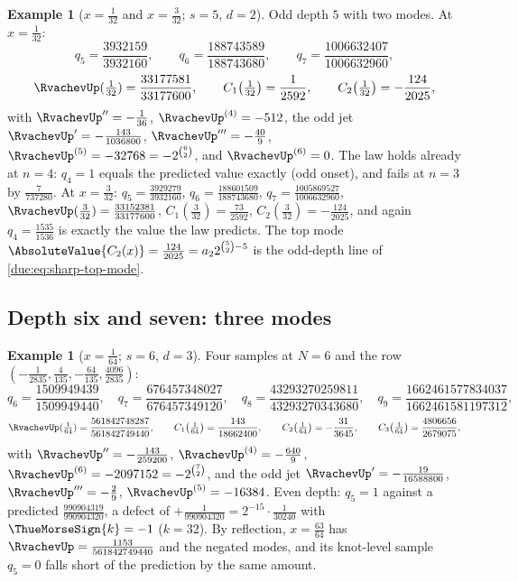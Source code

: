 \documentclass[11pt,oneside]{article}
\theoremstyle{plain}
\theoremstyle{definition}
\newtheorem{example}[theorem]{Example}
\theoremstyle{remark}
\newcommand{\upn}[1]{\RvachevUp_{#1}}
\newcommand{\am}[1]{a_{#1}}                                 %
\newcommand{\Cr}[2]{C_{#1}\!\left(#2\right)}                %
\newcommand{\qn}[1]{q_{#1}}                                 %
\begin{document}
\begin{example}[$x=\tfrac1{32}$ and $x=\tfrac3{32}$; $s=5$, $d=2$]
\label{due:ex:exr-thirty-second}
Odd depth $5$ with two modes.  At $x=\tfrac1{32}$:
\[
 \qn{5}=\frac{3932159}{3932160},\qquad
 \qn{6}=\frac{188743589}{188743680},\qquad
 \qn{7}=\frac{1006632407}{1006632960},
\]
\[
 \RvachevUp(\tfrac1{32})=\frac{33177581}{33177600},\qquad
 \Cr{1}{\tfrac1{32}}=\frac{1}{2592},\qquad
 \Cr{2}{\tfrac1{32}}=-\frac{124}{2025},
\]
with $\RvachevUp''=-\tfrac1{36}$, $\RvachevUp^{(4)}=-512$, the odd jet
$\RvachevUp'=-\tfrac{143}{1036800}$, $\RvachevUp'''=-\tfrac{40}9$,
$\RvachevUp^{(5)}=-32768=-2^{\binom62}$, and $\RvachevUp^{(6)}=0$.  The law
holds already at $n=4$: $\qn{4}=1$ equals the predicted value exactly
(odd onset), and fails at $n=3$ by $\tfrac7{737280}$.  At $x=\tfrac3{32}$:
$\qn{5}=\tfrac{3929279}{3932160}$, $\qn{6}=\tfrac{188601509}{188743680}$,
$\qn{7}=\tfrac{1005869527}{1006632960}$,
$\RvachevUp(\tfrac3{32})=\tfrac{33152381}{33177600}$,
$\Cr{1}{\tfrac3{32}}=\tfrac{73}{2592}$, $\Cr{2}{\tfrac3{32}}=-\tfrac{124}{2025}$,
and again $\qn{4}=\tfrac{1535}{1536}$ is exactly the value the law predicts.
The top mode $\AbsoluteValue{\Cr{2}{x}}=\tfrac{124}{2025}=\am{2}2^{\binom52-5}$
is the odd-depth line of \cref{due:eq:sharp-top-mode}.
\end{example}

\subsection{Depth six and seven: three modes}
\label{due:sec:exr-three-modes}

\begin{example}[$x=\tfrac1{64}$; $s=6$, $d=3$]
\label{due:ex:exr-sixty-fourth}
Four samples at $N=6$ and the row
$(-\tfrac1{2835},\tfrac4{135},-\tfrac{64}{135},\tfrac{4096}{2835})$:
\[
 \qn{6}=\frac{1509949439}{1509949440},\quad
 \qn{7}=\frac{676457348027}{676457349120},\quad
 \qn{8}=\frac{43293270259811}{43293270343680},\quad
 \qn{9}=\frac{1662461577834037}{1662461581197312},
\]
\[
 \RvachevUp(\tfrac1{64})=\frac{561842748287}{561842749440},\qquad
 \Cr{1}{\tfrac1{64}}=\frac{143}{18662400},\qquad
 \Cr{2}{\tfrac1{64}}=-\frac{31}{3645},\qquad
 \Cr{3}{\tfrac1{64}}=\frac{4806656}{2679075},
\]
with $\RvachevUp''=-\tfrac{143}{259200}$, $\RvachevUp^{(4)}=-\tfrac{640}9$,
$\RvachevUp^{(6)}=-2097152=-2^{\binom72}$, and the odd jet
$\RvachevUp'=-\tfrac{19}{16588800}$, $\RvachevUp'''=-\tfrac29$,
$\RvachevUp^{(5)}=-16384$.  Even depth: $\qn{5}=1$ against a predicted
$\tfrac{990904319}{990904320}$, a defect of $+\tfrac1{990904320}
=2^{-15}\cdot\tfrac1{30240}$ with $\ThueMorseSign{k}=-1$ ($k=32$).  By
reflection, $x=\tfrac{63}{64}$ has $\RvachevUp=\tfrac{1153}{561842749440}$
and the negated modes, and its knot-level sample $\qn{5}=0$ falls short of
the prediction by the same amount.
\end{example}
\end{document}
